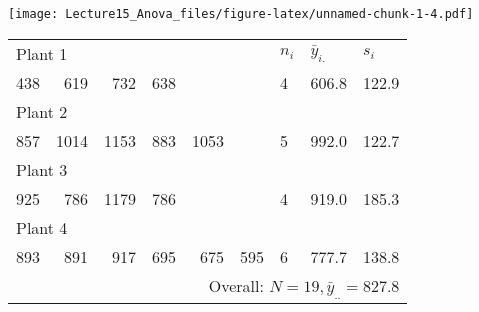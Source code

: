 \documentclass[]{article}
\begin{document}
\texttt{[image: Lecture15\_Anova\_files/figure-latex/unnamed-chunk-1-4.pdf]}

\begin{tabular}{rrrrrr|lll}
  \multicolumn{6}{l}{Plant 1} & $n_i$ & $\bar{y}_{i.}$ & $s_i$\\
  438 & 619 & 732 & 638 &    &    &    4 & 606.8  & 122.9 \\
 \hline
  \multicolumn{6}{l}{Plant 2}\\
  857 & 1014 & 1153 & 883 & 1053   &   & 5 & 992.0 & 122.7\\
\hline
  \multicolumn{6}{l}{Plant 3}\\
  925 & 786 & 1179 & 786     & &   & 4 & 919.0 & 185.3\\
\hline
 \multicolumn{6}{l}{Plant 4}\\
  893 & 891 & 917 & 695 & 675 & 595      & 6 & 777.7 & 138.8\\
\hline
  \multicolumn{9}{r}{Overall: $N = 19, \bar{y}_{..} = 827.8$}\\
\end{tabular}
\end{document}
